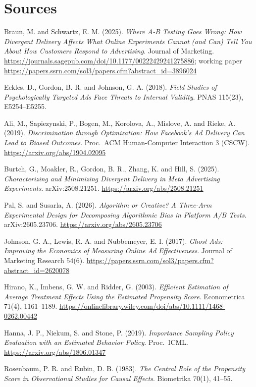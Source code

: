 \section*{Sources}
\begingroup\raggedright
\begin{enumerate}[label={[\arabic*]},leftmargin=2.5em]
\item Braun, M. and Schwartz, E. M. (2025). \emph{Where A-B Testing Goes Wrong: How Divergent Delivery Affects What Online Experiments Cannot (and Can) Tell You About How Customers Respond to Advertising}. Journal of Marketing. \url{https://journals.sagepub.com/doi/10.1177/00222429241275886}; working paper \url{https://papers.ssrn.com/sol3/papers.cfm?abstract_id=3896024}
\item Eckles, D., Gordon, B. R. and Johnson, G. A. (2018). \emph{Field Studies of Psychologically Targeted Ads Face Threats to Internal Validity}. PNAS 115(23), E5254--E5255.
\item Ali, M., Sapiezynski, P., Bogen, M., Korolova, A., Mislove, A. and Rieke, A. (2019). \emph{Discrimination through Optimization: How Facebook's Ad Delivery Can Lead to Biased Outcomes}. Proc.\ ACM Human-Computer Interaction 3 (CSCW). \url{https://arxiv.org/abs/1904.02095}
\item Burtch, G., Moakler, R., Gordon, B. R., Zhang, K. and Hill, S. (2025). \emph{Characterizing and Minimizing Divergent Delivery in Meta Advertising Experiments}. arXiv:2508.21251. \url{https://arxiv.org/abs/2508.21251}
\item Pal, S. and Susarla, A. (2026). \emph{Algorithm or Creative? A Three-Arm Experimental Design for Decomposing Algorithmic Bias in Platform A/B Tests}. arXiv:2605.23706. \url{https://arxiv.org/abs/2605.23706}
\item Johnson, G. A., Lewis, R. A. and Nubbemeyer, E. I. (2017). \emph{Ghost Ads: Improving the Economics of Measuring Online Ad Effectiveness}. Journal of Marketing Research 54(6). \url{https://papers.ssrn.com/sol3/papers.cfm?abstract_id=2620078}
\item Hirano, K., Imbens, G. W. and Ridder, G. (2003). \emph{Efficient Estimation of Average Treatment Effects Using the Estimated Propensity Score}. Econometrica 71(4), 1161--1189. \url{https://onlinelibrary.wiley.com/doi/abs/10.1111/1468-0262.00442}
\item Hanna, J. P., Niekum, S. and Stone, P. (2019). \emph{Importance Sampling Policy Evaluation with an Estimated Behavior Policy}. Proc.\ ICML. \url{https://arxiv.org/abs/1806.01347}
\item Rosenbaum, P. R. and Rubin, D. B. (1983). \emph{The Central Role of the Propensity Score in Observational Studies for Causal Effects}. Biometrika 70(1), 41--55.

\end{enumerate}
